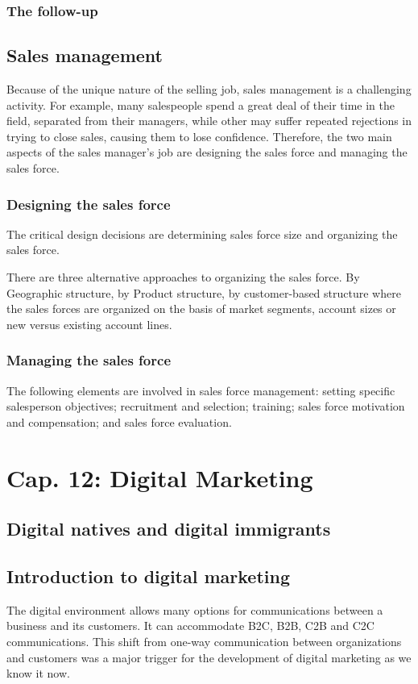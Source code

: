 \documentclass{article}
\begin{document}
\subsubsection*{The follow-up}

\subsection{Sales management}
Because of the unique nature of the selling job, sales management is a challenging activity. For example, many salespeople spend a great deal of their time in the field, separated from their managers, while other may suffer repeated rejections in trying to close sales, causing them to lose confidence. Therefore, the two main aspects of the sales manager's job are designing the sales force and managing the sales force.

\subsubsection{Designing the sales force}
The critical design decisions are determining sales force size and organizing the sales force.

There are three alternative approaches to organizing the sales force. By Geographic structure, by Product structure, by customer-based structure where the sales forces are organized on the basis of market segments, account sizes or new versus existing account lines.

\subsubsection{Managing the sales force}
The following elements are involved in sales force management: setting specific salesperson objectives; recruitment and selection; training; sales force motivation and compensation; and sales force evaluation.

\section{Cap. 12: Digital Marketing}

\subsection{Digital natives and digital immigrants}


\subsection{Introduction to digital marketing}
The digital environment allows many options for communications between a business and its customers. It can accommodate B2C, B2B, C2B and C2C communications. This shift from one-way communication between organizations and customers was a major trigger for the development of digital marketing as we know it now.
\end{document}
